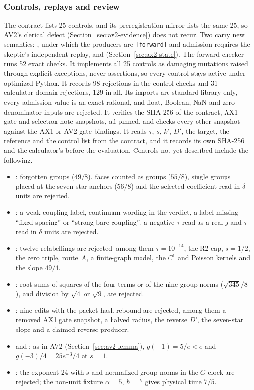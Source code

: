 \subsubsection{Controls, replays and review}
\label{sec:ax2-evidence}
The contract lists 25 controls, and its preregistration mirror lists the same
25, so AV2's clerical defect (Section~\ref{sec:av2-evidence}) does not recur.
Two carry new semantics: , under which the
producers are \texttt{[forward]} and admission requires the skeptic's
independent replay, and  (Section~\ref{sec:ax2-state}).
The forward checker runs 52 exact checks. It implements all 25 controls as
damaging mutations raised through explicit exceptions, never assertions, so
every control stays active under optimized Python. It records 98 rejections
in the control checks and 31 calculator-domain rejections, 129 in all. Its
imports are standard-library only, every admission value is an exact rational,
and float, Boolean, NaN and zero-denominator inputs are rejected. It verifies
the SHA-256 of the contract, AX1 gate and selection-note snapshots, all
pinned, and checks every other snapshot against the AX1 or AV2 gate
bindings.
It reads $\tau$, $s$, $k'$, $D'$, the target, the reference and the control
list from the contract, and it records its own SHA-256 and the calculator's
before the evaluation. Controls not yet described include the following.
\begin{itemize}\raggedright
\item {}: forgotten groups ($49/8$), faces
counted as groups ($55/8$), single groups placed at the seven star anchors
($56/8$) and the selected coefficient read in $\delta$ units are rejected.
\item {}: a weak-coupling label, continuum
wording in the verdict, a label missing ``fixed spacing'' or ``strong bare
coupling'', a negative $\tau$ read as a real $g$ and $\tau$ read in $\delta$
units are rejected.
\item {}: twelve relabellings are rejected,
among them $\tau=10^{-14}$, the R2 cap, $s=1/2$, the zero triple, route~A, a
finite-graph model, the $C^1$ and Poisson kernels and the slope $49/4$.
\item {}: root sums of squares of the four terms or of the
nine group norms ($\sqrt{345}/8$), and division by $\sqrt4$ or $\sqrt9$, are
rejected.
\item {}: nine edits with the packet hash
rebound are rejected, among them a removed AX1 gate snapshot, a halved
radius, the reverse $D'$, the seven-star slope and a claimed reverse
producer.
\item {} and
: as in AV2
(Section~\ref{sec:av2-lemma}), $g(-1)=5/e<e$ and $g(-3)/4=25e^{-3}/4$ at
$s=1$.
\item {}: the exponent 24 with $s$ and
normalized group norms in the $G$ clock are rejected; the non-unit fixture
$\alpha=5$, $\hbar=7$ gives physical time $7/5$.
\end{itemize}

